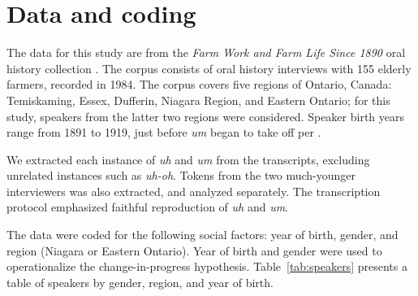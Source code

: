 \documentclass[11pt]{article}
\begin{document}
\section{Data and coding}

The data for this study are from the \emph{Farm Work and Farm Life Since 1890}
oral history collection \parencite{denis2016}.
The corpus consists of oral history interviews with 155 elderly farmers,
recorded in 1984.
The corpus covers five regions of Ontario, Canada: Temiskaming, Essex, Dufferin,
Niagara Region, and Eastern Ontario; for this study, speakers from the latter
two regions were considered.
Speaker birth years range from 1891 to 1919, just before \emph{um} began to take
off per \textcite{fruehwald2016}.

We extracted each instance of \emph{uh} and \emph{um} from the transcripts,
excluding unrelated instances such as \emph{uh-oh}.
Tokens from the two much-younger interviewers was also extracted, and analyzed
separately.
The transcription protocol emphasized faithful reproduction of \emph{uh} and
\emph{um}.

The data were coded for the following social factors:
year of birth, gender, and region (Niagara or Eastern Ontario).
Year of birth and gender were used to operationalize the change-in-progress
hypothesis.
Table~\ref{tab:speakers} presents a table of speakers by gender, region, and
year of birth.
\end{document}
